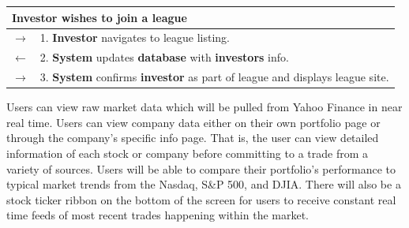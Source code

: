 \begin{centering}
\begin{longtable}{|p{1.2in} p{5in}|}
\multicolumn{2}{|p{6.2in}|}{\textbf{Investor} wishes to join a league} \\
\hline

$\rightarrow$ & 1. \textbf{Investor} navigates to league listing.\\
$\leftarrow$ & 2. \textbf{System} updates \textbf{database} with \textbf{investors} info.\\
$\rightarrow$ & 3. \textbf{System} confirms \textbf{investor} as part of league and displays
league site.\\
\hline
\end{longtable}
\end{centering}

Users can view raw market data which will be pulled from Yahoo Finance in near real time.
Users can view company data either on their own portfolio page or through the company’s
specific info page. That is, the user can view detailed information of each stock or company
before committing to a trade from a variety of sources. Users will be able to compare their
portfolio’s performance to typical market trends from the Nasdaq, S\&P 500, and DJIA. There
will also be a stock ticker ribbon on the bottom of the screen for users to receive constant
real time feeds of most recent trades happening within the market.\\ \\

